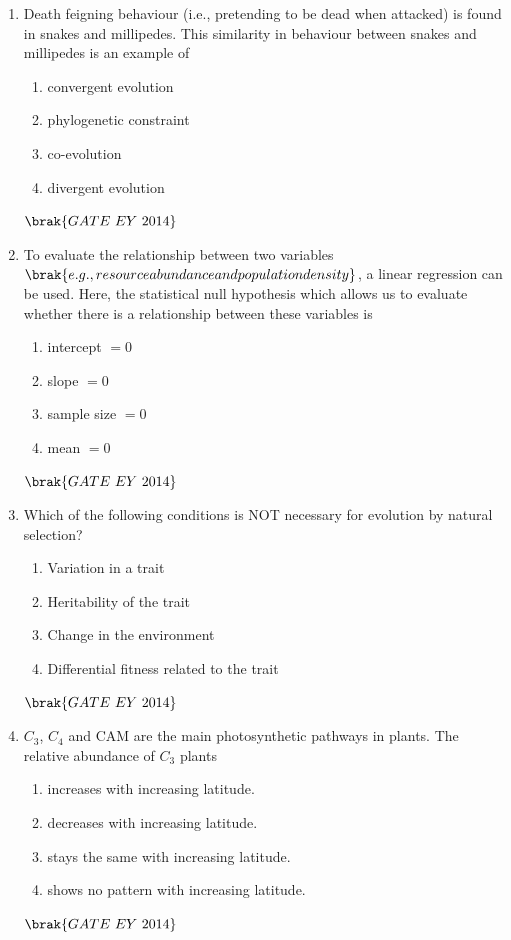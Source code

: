 \documentclass[journal]{IEEEtran}
\numberwithin{equation}{enumi}
\numberwithin{figure}{enumi}
\begin{document}
\begin{enumerate}
    \item Death feigning behaviour (i.e., pretending to be dead when attacked) is found in snakes and millipedes. This similarity in behaviour between snakes and millipedes is an example of
    \begin{multicols}{2}
    \begin{enumerate}
        \item convergent evolution
        \item phylogenetic constraint
        \item co-evolution
        \item divergent evolution
    \end{enumerate}
    \end{multicols}
    \hfill{$\brak{ GATE\ EY\ 2014}$}
    \bigskip

    \item To evaluate the relationship between two variables $\brak{e.g., resource abundance and population density}$, a linear regression can be used. Here, the statistical null hypothesis which allows us to evaluate whether there is a relationship between these variables is
    \begin{multicols}{2}
    \begin{enumerate}
        \item intercept $=0$
        \item slope $=0$
        \item sample size $=0$
        \item mean $=0$
    \end{enumerate}
    \end{multicols}
    \hfill{$\brak{ GATE\ EY\ 2014}$}
    \bigskip

    \item Which of the following conditions is NOT necessary for evolution by natural selection?
    \begin{multicols}{2}
    \begin{enumerate}
        \item Variation in a trait
        \item Heritability of the trait
        \item Change in the environment
        \item Differential fitness related to the trait
    \end{enumerate}
    \end{multicols}
    \hfill{$\brak{ GATE\ EY\ 2014}$}
    \bigskip
    
    \item $C_{3}$, $C_{4}$ and CAM are the main photosynthetic pathways in plants. The relative abundance of $C_{3}$ plants
    \begin{enumerate}
        \item increases with increasing latitude.
        \item decreases with increasing latitude.
        \item stays the same with increasing latitude.
        \item shows no pattern with increasing latitude.
    \end{enumerate}
    \hfill{$\brak{ GATE\ EY\ 2014}$}
    \bigskip
    

\end{enumerate}
\end{document}

